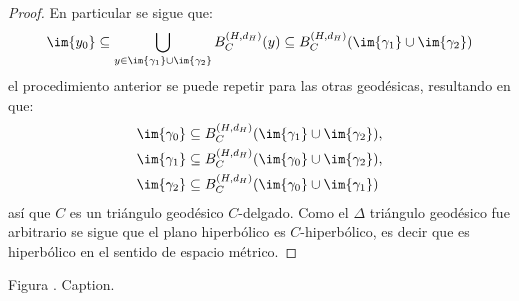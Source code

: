 \documentclass[12pt]{report}
\theoremstyle{largebreak}
\newcounter{figcount}
\begin{document}
\begin{proof}
        En particular se sigue que:
        \begin{equation*}
            \im{y_0}\subseteq \bigcup_{y\in\im{\gamma_1}\cup\im{\gamma_2}}B_C^{(H,d_H)}(y)\subseteq B_C^{(H,d_H)}( \im{\gamma_1}\cup\im{\gamma_2} )
        \end{equation*}
        el procedimiento anterior se puede repetir para las otras geodésicas, resultando en que:
        \begin{equation*}
            \begin{split}
                \im{\gamma_0}&\subseteq B_{C}^{(H,d_H)}(\im{\gamma_1}\cup\im{\gamma_2}),\\
                \im{\gamma_1}&\subseteq B_{C}^{(H,d_H)}(\im{\gamma_0}\cup\im{\gamma_2}),\\
                \im{\gamma_2}&\subseteq B_{C}^{(H,d_H)}(\im{\gamma_0}\cup\im{\gamma_1})\\
            \end{split}
        \end{equation*}
        así que $C$ es un triángulo geodésico $C$-delgado. Como el $\Delta$ triángulo geodésico fue arbitrario se sigue que el plano hiperbólico es $C$-hiperbólico, es decir que es hiperbólico en el sentido de espacio métrico.
    \end{proof}

    \begin{minipage}{\textwidth}
    	\begin{center}
	    Figura \thefigcount. Caption.
	\end{center}
    \end{minipage}

\end{document}
